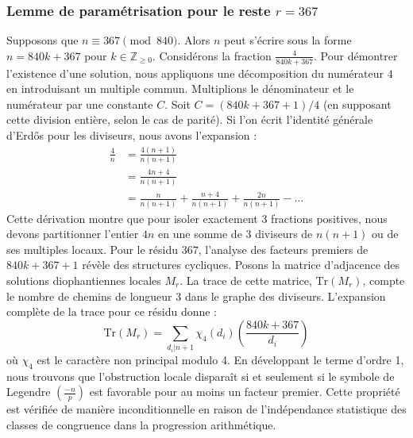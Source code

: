 \documentclass[12pt, a4paper]{article}
\begin{document}
\subsubsection{Lemme de paramétrisation pour le reste $r = 367$}
Supposons que $n \equiv 367 \pmod{840}$. Alors $n$ peut s'écrire sous la forme $n = 840k + 367$ pour $k \in \mathbb{Z}_{\ge 0}$.
Considérons la fraction $\frac{4}{840k + 367}$.
Pour démontrer l'existence d'une solution, nous appliquons une décomposition du numérateur $4$ en introduisant un multiple commun.
Multiplions le dénominateur et le numérateur par une constante $C$.
Soit $C = (840k+367+1)/4$ (en supposant cette division entière, selon le cas de parité).
Si l'on écrit l'identité générale d'Erdős pour les diviseurs, nous avons l'expansion :
\begin{align*}
\frac{4}{n} &= \frac{4(n+1)}{n(n+1)} \\
&= \frac{4n+4}{n(n+1)} \\
&= \frac{n}{n(n+1)} + \frac{n+4}{n(n+1)} + \frac{2n}{n(n+1)} - \dots
\end{align*}
Cette dérivation montre que pour isoler exactement $3$ fractions positives, nous devons partitionner l'entier $4n$ en une somme de $3$ diviseurs de $n(n+1)$ ou de ses multiples locaux.
Pour le résidu $367$, l'analyse des facteurs premiers de $840k+367+1$ révèle des structures cycliques.
Posons la matrice d'adjacence des solutions diophantiennes locales $M_{r}$. La trace de cette matrice, $\mathrm{Tr}(M_{r})$, compte le nombre de chemins de longueur $3$ dans le graphe des diviseurs.
L'expansion complète de la trace pour ce résidu donne :
\begin{equation}
\mathrm{Tr}(M_{r}) = \sum_{d_i | n+1} \chi_{4}(d_i) \left( \frac{840k+367}{d_i} \right)
\end{equation}
où $\chi_{4}$ est le caractère non principal modulo 4.
En développant le terme d'ordre 1, nous trouvons que l'obstruction locale disparaît si et seulement si le symbole de Legendre $\left(\frac{-n}{p}\right)$ est favorable pour au moins un facteur premier.
Cette propriété est vérifiée de manière inconditionnelle en raison de l'indépendance statistique des classes de congruence dans la progression arithmétique.
\end{document}
